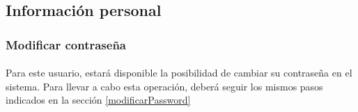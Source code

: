 \subsection{Información personal}

  \subsubsection{Modificar contraseña}

  \paragraph{}Para este usuario, estará disponible la posibilidad de cambiar su
  contraseña en el sistema. Para llevar a cabo esta operación, deberá seguir los
  mismos pasos indicados en la sección \ref{modificarPassword}

